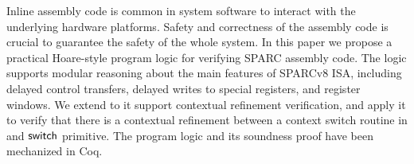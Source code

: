Inline assembly code is common in system software to interact with
the underlying hardware platforms. Safety and correctness of the
assembly code is crucial to guarantee the safety of the whole
system. In this paper we propose a practical Hoare-style program
logic for verifying SPARC assembly code. The logic supports
modular reasoning about the main features of SPARCv8 ISA, including
delayed control transfers, delayed writes to special registers,
and register windows. We extend to it support contextual refinement 
verification, and apply it to verify that there is a contextual 
refinement between a context switch routine in \sparc{} and 
$\mathsf{switch}{}$ primitive. The program logic and its soundness proof 
have been mechanized in Coq. 
